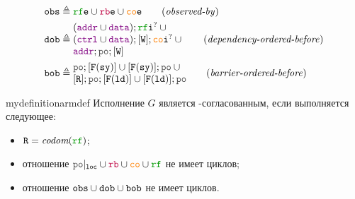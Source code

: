 \begin{align*}
\lOBS &\defeq  \lRFE \cup \lFRE \cup \lCOE  \tag{\emph{observed-by}} \\
\lDOB &\defeq \inarr{(\lADDR \cup \lDATA); \lRFI^? \cup {} \\
	(\lCTRL \cup \lDATA); [\lW]; \lCOI^? \cup {} \\
	\lADDR; \lPO; [\lW]} \tag{\emph{dependency-ordered-before}} \\
\lBOB &\defeq \inarr{\lPO; [\lDMBSY] \cup [\lDMBSY]; \lPO  \cup {} \\
                    {} [\lR]; \lPO; [\lDMBLD] \cup [\lDMBLD]; \lPO} \tag{\emph{barrier-ordered-before}}
\end{align*}

\begin{restatable}{mydefinition}{armdef}
Исполнение $G$ является \ARM-согласованным, если выполняется следующее:
\begin{itemize}
\item $\lR = \codom{\lRF}$; 
\item отношение $\lPO\rst{\lLOC} \cup \lFR \cup \lCO \cup \lRF$ не имеет циклов; 
\item отношение ${\mathtt{obs}} \cup {\mathtt{dob}} \cup {\mathtt{bob}}$ не имеет циклов. 
\end{itemize}
\end{restatable}
